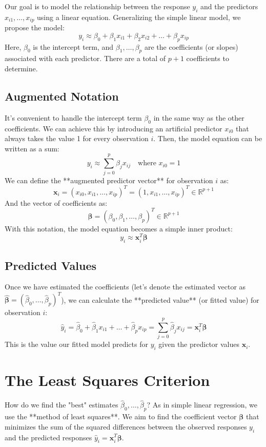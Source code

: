 \documentclass[11pt]{article}
\theoremstyle{definition}
\newcommand{\R}{\mathbb{R}}
\newcommand{\T}{^T} %
\begin{document}
Our goal is to model the relationship between the response $y_i$ and the predictors $x_{i1}, \dots, x_{ip}$ using a linear equation. Generalizing the simple linear model, we propose the model:
\[ y_i \approx \beta_0 + \beta_1 x_{i1} + \beta_2 x_{i2} + \dots + \beta_p x_{ip} \]
Here, $\beta_0$ is the intercept term, and $\beta_1, \dots, \beta_p$ are the coefficients (or slopes) associated with each predictor. There are a total of $p+1$ coefficients to determine.

\subsection{Augmented Notation}

It's convenient to handle the intercept term $\beta_0$ in the same way as the other coefficients. We can achieve this by introducing an artificial predictor $x_{i0}$ that always takes the value 1 for every observation $i$.
Then, the model equation can be written as a sum:
\[ y_i \approx \sum_{j=0}^{p} \beta_j x_{ij} \quad \text{where } x_{i0} = 1 \]
We can define the **augmented predictor vector** for observation $i$ as:
\[ \mathbf{x}_i = (x_{i0}, x_{i1}, \dots, x_{ip})\T = (1, x_{i1}, \dots, x_{ip})\T \in \R^{p+1} \]
And the vector of coefficients as:
\[ \boldsymbol{\beta} = (\beta_0, \beta_1, \dots, \beta_p)\T \in \R^{p+1} \]
With this notation, the model equation becomes a simple inner product:
\[ y_i \approx \mathbf{x}_i\T \boldsymbol{\beta} \]

\subsection{Predicted Values}

Once we have estimated the coefficients (let's denote the estimated vector as $\hat{\boldsymbol{\beta}} = (\hat{\beta}_0, \dots, \hat{\beta}_p)\T$), we can calculate the **predicted value** (or fitted value) for observation $i$:
\[ \hat{y}_i = \hat{\beta}_0 + \hat{\beta}_1 x_{i1} + \dots + \hat{\beta}_p x_{ip} = \sum_{j=0}^{p} \hat{\beta}_j x_{ij} = \mathbf{x}_i\T \hat{\boldsymbol{\beta}} \]
This is the value our fitted model predicts for $y_i$ given the predictor values $\mathbf{x}_i$.

\section{The Least Squares Criterion}

How do we find the "best" estimates $\hat{\beta}_0, \dots, \hat{\beta}_p$? As in simple linear regression, we use the **method of least squares**. We aim to find the coefficient vector $\boldsymbol{\beta}$ that minimizes the sum of the squared differences between the observed responses $y_i$ and the predicted responses $\hat{y}_i = \mathbf{x}_i\T \boldsymbol{\beta}$.
\end{document}
